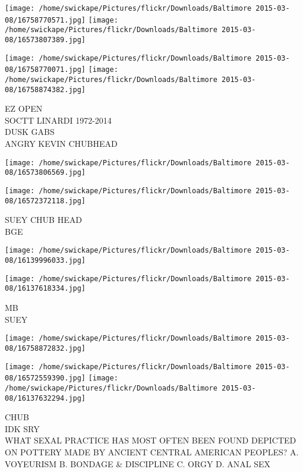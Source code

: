 \documentclass[10pt,letterpaper]{article}
\begin{document}
\texttt{[image: /home/swickape/Pictures/flickr/Downloads/Baltimore 2015-03-08/16758770571.jpg]}
\texttt{[image: /home/swickape/Pictures/flickr/Downloads/Baltimore 2015-03-08/16573807389.jpg]}

\texttt{[image: /home/swickape/Pictures/flickr/Downloads/Baltimore 2015-03-08/16758770071.jpg]}
\texttt{[image: /home/swickape/Pictures/flickr/Downloads/Baltimore 2015-03-08/16758874382.jpg]}

EZ OPEN\\
SOCTT LINARDI 1972{-}2014\\
DUSK GABS\\
ANGRY KEVIN CHUBHEAD\\
\pagebreak

\texttt{[image: /home/swickape/Pictures/flickr/Downloads/Baltimore 2015-03-08/16573806569.jpg]}

\vspace{0.25in}
\texttt{[image: /home/swickape/Pictures/flickr/Downloads/Baltimore 2015-03-08/16572372118.jpg]}

SUEY CHUB HEAD\\
BGE\\
\pagebreak

\texttt{[image: /home/swickape/Pictures/flickr/Downloads/Baltimore 2015-03-08/16139996033.jpg]}

\vspace{0.25in}
\texttt{[image: /home/swickape/Pictures/flickr/Downloads/Baltimore 2015-03-08/16137618334.jpg]}

MB\\
SUEY\\
\pagebreak

\texttt{[image: /home/swickape/Pictures/flickr/Downloads/Baltimore 2015-03-08/16758872832.jpg]}

\vspace{0.25in}
\texttt{[image: /home/swickape/Pictures/flickr/Downloads/Baltimore 2015-03-08/16572559390.jpg]}
\texttt{[image: /home/swickape/Pictures/flickr/Downloads/Baltimore 2015-03-08/16137632294.jpg]}

CHUB\\
IDK SRY\\
WHAT SEXAL PRACTICE HAS MOST OFTEN BEEN FOUND DEPICTED ON POTTERY MADE BY ANCIENT CENTRAL AMERICAN PEOPLES?  A. VOYEURISM B. BONDAGE \& DISCIPLINE C. ORGY D. ANAL SEX\\
\pagebreak
\end{document}
